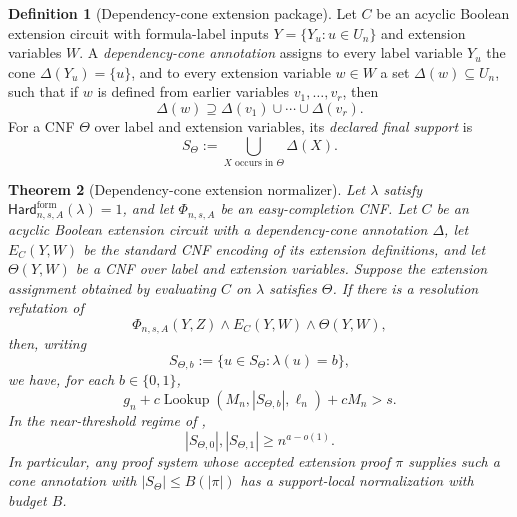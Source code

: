\documentclass[11pt]{article}
\newtheorem{theorem}{Theorem}[section]
\theoremstyle{definition}
\newtheorem{definition}[theorem]{Definition}
\newcommand{\bits}{\{0,1\}}
\newcommand{\Lookup}{\operatorname{Lookup}}
\newcommand{\HardF}{\mathsf{Hard}^{\mathrm{form}}}
\begin{document}
\begin{definition}[Dependency-cone extension package]\label{def:dependency-cone-extension}
Let \(C\) be an acyclic Boolean extension circuit with formula-label inputs \(Y=\{Y_u:u\in U_n\}\) and extension variables \(W\).  A \emph{dependency-cone annotation} assigns to every label variable \(Y_u\) the cone \(\Delta(Y_u)=\{u\}\), and to every extension variable \(w\in W\) a set \(\Delta(w)\subseteq U_n\), such that if \(w\) is defined from earlier variables \(v_1,\ldots,v_r\), then
\[
  \Delta(w)\supseteq\Delta(v_1)\cup\cdots\cup\Delta(v_r).
\]
For a CNF \(\Theta\) over label and extension variables, its \emph{declared final support} is
\[
  S_\Theta:=\bigcup_{X\text{ occurs in }\Theta}\Delta(X).
\]
\end{definition}

\begin{theorem}[Dependency-cone extension normalizer]\label{thm:dependency-cone-extension-normalizer}
Let \(\lambda\) satisfy \(\HardF_{n,s,A}(\lambda)=1\), and let \(\Phi_{n,s,A}\) be an easy-completion CNF.  Let \(C\) be an acyclic Boolean extension circuit with a dependency-cone annotation \(\Delta\), let \(E_C(Y,W)\) be the standard CNF encoding of its extension definitions, and let \(\Theta(Y,W)\) be a CNF over label and extension variables.  Suppose the extension assignment obtained by evaluating \(C\) on \(\lambda\) satisfies \(\Theta\).  If there is a resolution refutation of
\[
  \Phi_{n,s,A}(Y,Z)\wedge E_C(Y,W)\wedge\Theta(Y,W),
\]
then, writing
\[
  S_{\Theta,b}:=\{u\in S_\Theta:\lambda(u)=b\},
\]
we have, for each \(b\in\bits\),
\[
  g_n+c\Lookup(M_n,|S_{\Theta,b}|,\ell_n)+cM_n>s.
\]
In the near-threshold regime of ,
\[
  |S_{\Theta,0}|,|S_{\Theta,1}|\ge n^{a-o(1)}.
\]
In particular, any proof system whose accepted extension proof \(\pi\) supplies such a cone annotation with \(|S_\Theta|\le B(|\pi|)\) has a support-local normalization with budget \(B\).
\end{theorem}
\end{document}
